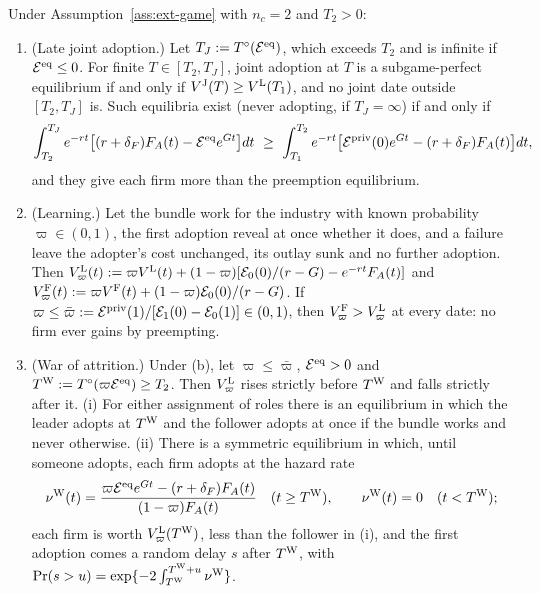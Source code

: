 \begin{proposition}\label{prop:ext-game-wait}
Under Assumption~\ref{ass:ext-game} with $n_c=2$ and $T_2>0$:
\begin{enumerate}
\item[(a)] (Late joint adoption.) Let $T_J:=T^\circ(\mathcal E^{\rm eq})$, which exceeds $T_2$ and is infinite if $\mathcal E^{\rm eq}\le0$. For finite $T\in[T_2,T_J]$, joint adoption at $T$ is a subgame-perfect equilibrium if and only if $V^{\rm J}(T)\ge V^{\rm L}(T_1)$, and no joint date outside $[T_2,T_J]$ is. Such equilibria exist (never adopting, if $T_J=\infty$) if and only if
\begin{equation}\label{eq:ext-game-joint}
\int_{T_2}^{T_J}e^{-rt}\bigl[(r+\delta_F)F_A(t)-\mathcal E^{\rm eq}e^{Gt}\bigr]dt\ \ge\ \int_{T_1}^{T_2}e^{-rt}\bigl[\mathcal E^{\rm priv}(0)e^{Gt}-(r+\delta_F)F_A(t)\bigr]dt,
\end{equation}
and they give each firm more than the preemption equilibrium.
\item[(b)] (Learning.) Let the bundle work for the industry with known probability $\varpi\in(0,1)$, the first adoption reveal at once whether it does, and a failure leave the adopter's cost unchanged, its outlay sunk and no further adoption. Then $V^{\rm L}_\varpi(t):=\varpi V^{\rm L}(t)+(1-\varpi)[\mathcal E_0(0)/(r-G)-e^{-rt}F_A(t)]$ and $V^{\rm F}_\varpi(t):=\varpi V^{\rm F}(t)+(1-\varpi)\mathcal E_0(0)/(r-G)$. If $\varpi\le\bar\varpi:=\mathcal E^{\rm priv}(1)/[\mathcal E_1(0)-\mathcal E_0(1)]\in(0,1)$, then $V^{\rm F}_\varpi>V^{\rm L}_\varpi$ at every date: no firm ever gains by preempting.
\item[(c)] (War of attrition.) Under (b), let $\varpi\le\bar\varpi$, $\mathcal E^{\rm eq}>0$ and $T^{\rm W}:=T^\circ(\varpi\mathcal E^{\rm eq})\ge T_2$. Then $V^{\rm L}_\varpi$ rises strictly before $T^{\rm W}$ and falls strictly after it. (i) For either assignment of roles there is an equilibrium in which the leader adopts at $T^{\rm W}$ and the follower adopts at once if the bundle works and never otherwise. (ii) There is a symmetric equilibrium in which, until someone adopts, each firm adopts at the hazard rate
\begin{equation}\label{eq:ext-game-hazard}
\nu^{\rm W}(t)=\frac{\varpi\mathcal E^{\rm eq}e^{Gt}-(r+\delta_F)F_A(t)}{(1-\varpi)F_A(t)}\quad(t\ge T^{\rm W}),\qquad \nu^{\rm W}(t)=0\quad(t<T^{\rm W});
\end{equation}
each firm is worth $V^{\rm L}_\varpi(T^{\rm W})$, less than the follower in (i), and the first adoption comes a random delay $s$ after $T^{\rm W}$, with $\Pr(s>u)=\exp\{-2\int_{T^{\rm W}}^{T^{\rm W}+u}\nu^{\rm W}\}$.
\end{enumerate}
\end{proposition}

